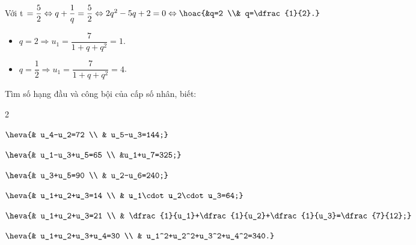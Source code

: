 \begin{vd}
{\begin{enumerate}
			Với t $=\dfrac{5}{2} \Leftrightarrow q+\dfrac{1}{q}=\dfrac{5}{2} \Leftrightarrow 2 q^{2}-5 q+2=0 \Leftrightarrow \hoac{&q=2 \\& q=\dfrac{1}{2}.}$
			\begin{itemize}
				\item $q=2 \Rightarrow u_{1}=\dfrac{7}{1+q+q^{2}}=1$. 
				\item $q=\dfrac{1}{2} \Rightarrow u_{1}=\dfrac{7}{1+q+q^{2}}=4$.
			\end{itemize}
		\end{enumerate}
	}
\end{vd}

\begin{vd}%
	Tìm số hạng đầu và công bội của cấp số nhân, biết: 
	\begin{enumEX}{2}
		\item $\heva{& u_4-u_2=72 \\ & u_5-u_3=144;}$
		\item $\heva{& u_1-u_3+u_5=65 \\ &u_1+u_7=325;}$
		\item $\heva{& u_3+u_5=90 \\ & u_2-u_6=240;}$
		\item $\heva{& u_1+u_2+u_3=14 \\ & u_1\cdot u_2\cdot u_3=64;}$
		\item $\heva{& u_1+u_2+u_3=21 \\ & \dfrac{1}{u_1}+\dfrac{1}{u_2}+\dfrac{1}{u_3}=\dfrac{7}{12};}$
		\item $\heva{& u_1+u_2+u_3+u_4=30 \\ & u_1^2+u_2^2+u_3^2+u_4^2=340.}$
	\end{enumEX}	
\end{vd}
